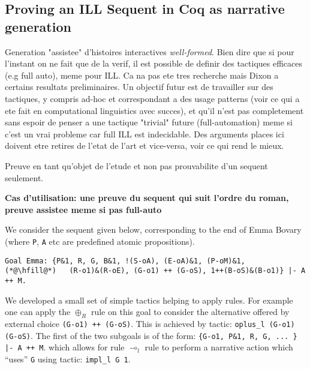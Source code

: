 \documentclass[runningheads,a4paper]{llncs}
\begin{document}
\subsection{Proving an ILL Sequent in Coq as narrative generation}
\label{sec:proving-an-ill}

Generation "assistee" d'histoires interactives \emph{well-formed}. Bien dire que si pour l'instant on ne fait que de la verif, il est possible de definir des tactiques efficaces (e.g full auto), meme pour ILL. Ca na pas ete tres recherche mais Dixon a certains resultats preliminaires. Un objectif futur est de travailler sur des tactiques, y compris ad-hoc et correspondant a des usage patterns (voir ce qui a ete fait en computational linguistics avec succes), et qu'il n'est pas completement sans espoir de penser a une tactique "trivial" future (full-automation) meme si c'est un vrai probleme car full ILL est indecidable. Des arguments places ici doivent etre retires de l'etat de l'art et vice-versa, voir ce qui rend le mieux.

Preuve en tant qu'objet de l'etude et non pas prouvabilite d'un sequent seulement.

\textbf{Cas d'utilisation: une preuve du sequent qui suit l'ordre du roman, preuve assistee meme si pas full-auto}

We consider the sequent given below, corresponding to the end of Emma
Bovary (where \texttt{P}, \texttt{A} etc are predefined atomic
propositions).
\begin{lstlisting}[language=Coq]
Goal Emma: {P&1, R, G, B&1, !(S-oA), (E-oA)&1, (P-oM)&1,
(*@\hfill@*)   (R-o1)&(R-oE), (G-o1) ++ (G-oS), 1++(B-oS)&(B-o1)} |- A ++ M.
\end{lstlisting}
We developed a small set of simple tactics helping to apply rules. For
example one can apply the $\oplus_R$ rule on this goal to consider the
alternative offered by external choice \lstinline|(G-o1) ++ (G-oS)|.
This is achieved by tactic: \lstinline|oplus_l (G-o1) (G-oS)|. The
first of the two subgoals is of the form:
\lstinline!{G-o1, P&1, R, G, ... } |- A ++ M!. which allows for rule
$\multimap_l$ rule to perform a narrative action which ``uses''
\lstinline|G| using tactic: \lstinline|impl_l G 1|. 
\end{document}
